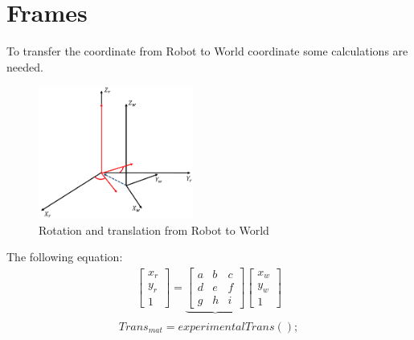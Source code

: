 \chapter{Frames}\label{ch:frames}
To transfer the coordinate from Robot to World coordinate some calculations are needed.
\begin{figure}[hb]
  \centering
  \includegraphics[width=2in]{figures/coordrobottoworld.png}
  \caption[Coordinates from robot to world] {Rotation and translation from Robot to World}
  \label{fig:coordrobottoworld}
\end{figure}

The following equation:
\begin{align*}
\begin{bmatrix}
x_r \\
y_r \\
1 
\end{bmatrix}
= \underbrace{\begin{bmatrix}
a & b & c \\
d & e & f \\
g & h & i 
\end{bmatrix}}_{\text{}}
\begin{bmatrix}
x_w \\
y_w \\
1 
\end{bmatrix}
\end{align*}
%
%
%
\begin{align}
Trans_{mat} = experimentalTrans();
\end{align}

